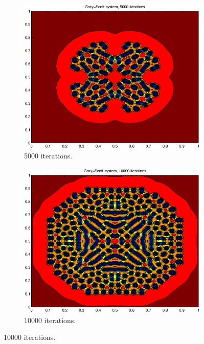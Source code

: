 \documentclass[a4paper,11pt]{article}
\begin{document}
\begin{figure}
    \hfill
    \begin{subfigure}[b]{0.48\textwidth}
        \centering
        \includegraphics[width=\textwidth]{it_5000}
        \caption{5000 iterations.}
        \label{fig:it_5000}
    \end{subfigure}
    \hfill
    \begin{subfigure}[b]{0.48\textwidth}
        \centering
        \includegraphics[width=\textwidth]{it_10000}
        \caption{10000 iterations.}
        \label{fig:it_10000}
    \end{subfigure}

\end{figure}
\end{document}
